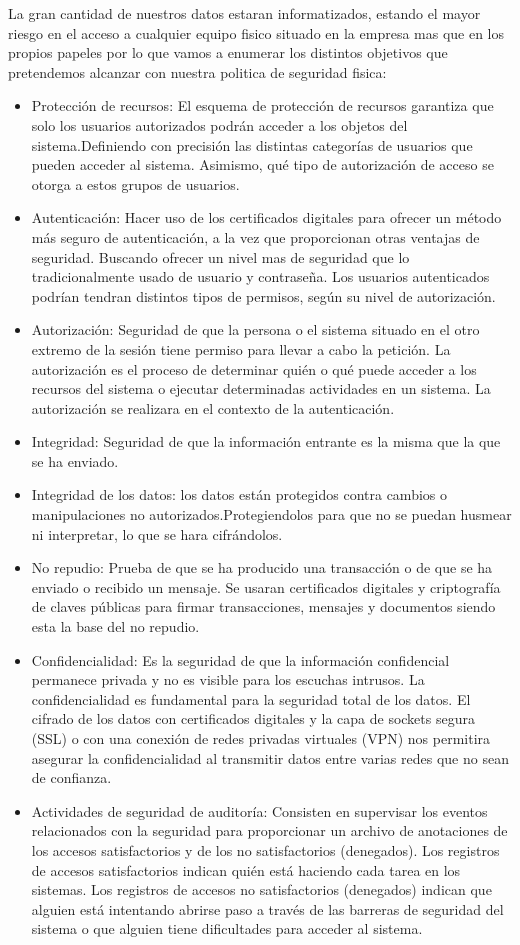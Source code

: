 \documentclass[11pt,bibtotoc,noliststotoc,BCOR0mm]{scrbook}
\begin{document}
La gran cantidad de nuestros datos estaran informatizados, estando el mayor riesgo en el acceso a cualquier equipo fisico situado en la empresa mas que en los propios papeles por lo que vamos a enumerar los distintos objetivos que pretendemos alcanzar con nuestra politica de seguridad fisica:
\begin{itemize}
\item Protección de recursos: El esquema de protección de recursos garantiza que solo los usuarios autorizados podrán acceder a los objetos del sistema.Definiendo con precisión las distintas categorías de usuarios que pueden acceder al sistema. Asimismo, qué tipo de autorización de acceso se otorga a estos grupos de usuarios.
\item Autenticación: Hacer uso de los certificados digitales para ofrecer un método más seguro de autenticación, a la vez que proporcionan otras ventajas de seguridad. Buscando ofrecer un nivel mas de seguridad que lo tradicionalmente usado de usuario y contraseña. Los usuarios autenticados podrían tendran distintos tipos de permisos, según su nivel de autorización.
\item Autorización: Seguridad de que la persona o el sistema situado en el otro extremo de la sesión tiene permiso para llevar a cabo la petición. La autorización es el proceso de determinar quién o qué puede acceder a los recursos del sistema o ejecutar determinadas actividades en un sistema. La autorización se realizara en el contexto de la autenticación.
\item Integridad: Seguridad de que la información entrante es la misma que la que se ha enviado.

\item Integridad de los datos: los datos están protegidos contra cambios o manipulaciones no autorizados.Protegiendolos para que no se puedan husmear ni interpretar, lo que se hara cifrándolos.
\item No repudio: Prueba de que se ha producido una transacción o de que se ha enviado o recibido un mensaje. Se usaran certificados digitales y criptografía de claves públicas para firmar transacciones, mensajes y documentos siendo esta la base del no repudio.
\item Confidencialidad: Es la seguridad de que la información confidencial permanece privada y no es visible para los escuchas intrusos. La confidencialidad es fundamental para la seguridad total de los datos. El cifrado de los datos con certificados digitales y la capa de sockets segura (SSL) o con una conexión de redes privadas virtuales (VPN) nos permitira asegurar la confidencialidad al transmitir datos entre varias redes que no sean de confianza.
\item Actividades de seguridad de auditoría: Consisten en supervisar los eventos relacionados con la seguridad para proporcionar un archivo de anotaciones de los accesos satisfactorios y de los no satisfactorios (denegados). Los registros de accesos satisfactorios indican quién está haciendo cada tarea en los sistemas. Los registros de accesos no satisfactorios (denegados) indican que alguien está intentando abrirse paso a través de las barreras de seguridad del sistema o que alguien tiene dificultades para acceder al sistema.


\end{itemize}
\end{document}
